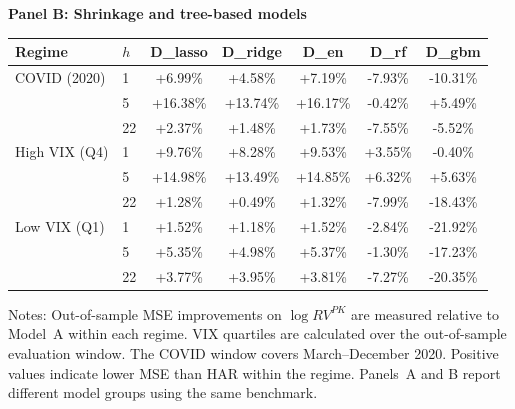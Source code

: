 \begin{table}[htbp]
\par\medskip
\textbf{Panel B: Shrinkage and tree-based models}\par\smallskip
\begin{tabular*}{\linewidth}{@{\extracolsep{\fill}}llccccc@{}}
\toprule
Regime & $h$ & D\_lasso & D\_ridge & D\_en & D\_rf & D\_gbm \\
\midrule
COVID (2020) & 1 & +6.99\% & +4.58\% & +7.19\% & -7.93\% & -10.31\% \\
 & 5 & +16.38\% & +13.74\% & +16.17\% & -0.42\% & +5.49\% \\
 & 22 & +2.37\% & +1.48\% & +1.73\% & -7.55\% & -5.52\% \\
High VIX (Q4) & 1 & +9.76\% & +8.28\% & +9.53\% & +3.55\% & -0.40\% \\
 & 5 & +14.98\% & +13.49\% & +14.85\% & +6.32\% & +5.63\% \\
 & 22 & +1.28\% & +0.49\% & +1.32\% & -7.99\% & -18.43\% \\
Low VIX (Q1) & 1 & +1.52\% & +1.18\% & +1.52\% & -2.84\% & -21.92\% \\
 & 5 & +5.35\% & +4.98\% & +5.37\% & -1.30\% & -17.23\% \\
 & 22 & +3.77\% & +3.95\% & +3.81\% & -7.27\% & -20.35\% \\
\bottomrule
\end{tabular*}
\begin{tablenotes}\small
\item Notes: Out-of-sample MSE improvements on $\log RV^{PK}$ are measured
relative to Model~A within each regime. VIX quartiles are calculated over
the out-of-sample evaluation window. The COVID window covers March--December
2020. Positive values indicate lower MSE than HAR within the regime.
Panels~A and B report different model groups using the same benchmark.
\end{tablenotes}
\end{table}
